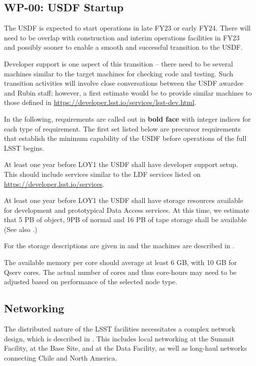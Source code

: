 \subsection{\textbf{WP-00}: \gls{USDF} Startup}
\label{sect:wp00}

The \gls{USDF} is expected to start operations in late FY23 or early FY24.
There will need to be overlap with construction and interim operations
facilities in FY23 and
possibly sooner to enable a smooth and successful transition to the \gls{USDF}.

Developer support is one aspect of this transition -- there need to be several
machines
similar to the target machines for checking code and testing. Such transition
activities
will involve close conversations between the \gls{USDF} awardee and Rubin staff; however, a first estimate would be to provide similar
machines to those defined in
\url{https://developer.lsst.io/services/lsst-dev.html}.

In the following, requirements are called out in {\bf bold face} with integer indices for each type of requirement. The first set listed below are precursor requirements that establish the minimum capability of the \gls{USDF} before operations of the full \gls{LSST} begins.

\reqsimp{}{}{}{}{}
{
At least one year before \gls{LOY1} the USDF shall have developer support setup. This should include
services similar to the LDF services listed on \url{https://developer.lsst.io/services}.
}

\reqsimp{}{}{}{}{}
{
At least one year before LOY1 the USDF shall have storage resources available for development and prototypical Data Access services.
At this time, we estimate that 5 PB of object, 9PB of normal and 16 PB of tape storage shall be available
 (See also .)
}



For  the storage descriptions are given in  and
the machines are described in .


The available memory per core should average at least 6 GB, with 10 GB for Qserv cores.
The actual number of cores and thus core-hours may need to be adjusted based on performance of the selected node type.




\subsection{Networking} \label{sec:networking}
The distributed nature of the LSST facilities necessitates a complex network design, which is described in .
This includes local networking at the Summit Facility, at the Base Site, and at the Data Facility, as well as long-haul networks connecting Chile and North America.

